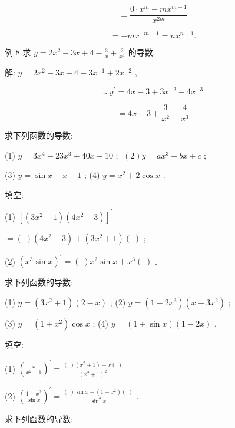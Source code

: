 \documentclass[lang=cn,newtx,12pt,scheme=chinese]{elegantbook}
\begin{document}
\[
= \frac{0 \cdot {x}^{m} - m{x}^{m - 1}}{{x}^{2m}}
\]

\[
= - m{x}^{-m - 1} = n{x}^{n - 1}.
\]

例 8 求 \(y = 2{x}^{2} - {3x} + 4 - \frac{3}{x} + \frac{2}{{x}^{2}}\) 的导数.

解: \(y = 2{x}^{2} - {3x} + 4 - 3{x}^{-1} + 2{x}^{-2}\) ,

\[
\therefore \;{y}^{\prime } = {4x} - 3 + 3{x}^{-2} - 4{x}^{-3}
\]

\[
= {4x} - 3 + \frac{3}{{x}^{2}} - \frac{4}{{x}^{3}}
\]

\begin{problemset}[练习]

\item 求下列函数的导数:

(1) \(y = 3{x}^{4} - {23}{x}^{3} + {40x} - {10}\) ; \(\;\left( 2\right) y = a{x}^{3} - {bx} + c\) ;

(3) \(y = \sin x - x + 1\) ; (4) \(y = {x}^{2} + 2\cos x\) .

\item 填空:

(1) \({\left\lbrack \left( 3{x}^{2} + 1\right) \left( 4{x}^{2} - 3\right) \right\rbrack }^{\prime }\)

\(= \left( \;\right) \left( {4{x}^{2} - 3}\right) + \left( {3{x}^{2} + 1}\right) \left( \;\right)\) ;

(2) \({\left( {x}^{3}\sin x\right) }^{\prime } = \left( \;\right) {x}^{2}\sin x + {x}^{3}\left( \;\right)\) .

\item 求下列函数的导数:

(1) \(y = \left( {3{x}^{2} + 1}\right) \left( {2 - x}\right)\) ; (2) \(y = \left( {1 - 2{x}^{3}}\right) \left( {x - 3{x}^{2}}\right)\) ;

(3) \(y = \left( {1 + {x}^{2}}\right) \cos x\) ; (4) \(y = \left( {1 + \sin x}\right) \left( {1 - {2x}}\right)\) .

\item 填空:

(1) \({\left( \frac{x}{{x}^{2} + 1}\right) }^{\prime } = \frac{\left( \;\right) \left( {{x}^{2} + 1}\right) - x\left( \;\right) }{{\left( {x}^{2} + 1\right) }^{2}}\)

(2) \({\left( \frac{1 - {x}^{2}}{\sin x}\right) }^{\prime } = \frac{\left( \;\right) \sin x - \left( {1 - {x}^{2}}\right) \left( \;\right) }{{\sin }^{2}x}\) .

\item 求下列函数的导数:


\end{problemset}
\end{document}
